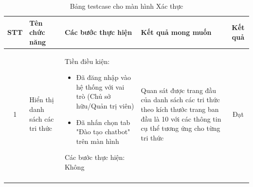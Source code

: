 \begin{longtable}{|c|m{2.5cm}|m{5.5cm}|m{4.5cm}|c|}
    \hline
    \textbf{STT} & \textbf{Tên chức năng} & \textbf{Các bước thực hiện} & \textbf{Kết quả mong muốn} & \textbf{Kết quả} \\
    \hline
    1 & 
    Hiển thị danh sách các tri thức & 
    Tiền điều kiện:
    \begin{itemize}
        \item Đã đăng nhập vào hệ thống với vai trò (Chủ sở hữu/Quản trị viên)
        \item Đã nhấn chọn tab "Đào tạo chatbot" trên màn hình
    \end{itemize}
    Các bước thực hiện: Không
    & 
    Quan sát được trang đầu của danh sách các tri thức theo kích thước trang ban đầu là 10 với các thông tin cụ thể tương ứng cho  từng tri thức& Đạt \\
    \hline
    \caption{Bảng testcase cho màn hình Xác thực}
\end{longtable}